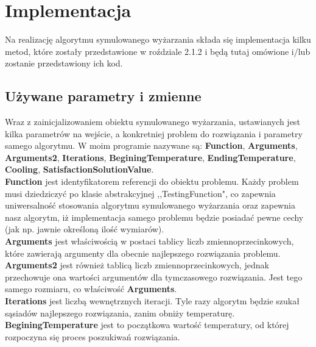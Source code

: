\documentclass[twoside]{projektInzynierskiMS1}
\newcommand{\si}{ś}
\begin{document}
\section{Implementacja}

Na realizację algorytmu symulowanego wyżarzania składa się implementacja kilku metod, które zostały przedstawione w roździale 2.1.2 i będą tutaj omówione i/lub zostanie przedstawiony ich kod. \\

\subsection{Używane parametry i zmienne}
Wraz z zainicjalizowaniem obiektu symulowanego wyżarzania, ustawianych jest kilka parametrów na wej\si cie, a konkretniej problem do rozwiązania i parametry samego algorytmu. W moim programie nazywane są: \textbf{Function}, \textbf{Arguments}, \textbf{Arguments2}, \textbf{Iterations}, \textbf{BeginingTemperature}, \textbf{EndingTemperature}, \textbf{Cooling}, \textbf{SatisfactionSolutionValue}. \\

\textbf{Function} jest identyfikatorem referencji do obiektu problemu. Każdy problem musi dziedziczyć po klasie abstrakcyjnej ,,TestingFunction", co zapewnia uniwersalno\si ć stosowania algorytmu symulowanego wyżarzania oraz zapewnia nasz algorytm, iż implementacja samego problemu będzie posiadać pewne cechy (jak np. jawnie okre\si loną ilo\si ć wymiarów). \\

\textbf{Arguments} jest wła\si ciwo\si cią w postaci tablicy liczb zmiennoprzecinkowych, które zawierają argumenty dla obecnie najlepszego rozwiązania problemu. \\

\textbf{Arguments2} jest również tablicą liczb zmiennoprzecinkowych, jednak przechowuje ona warto\si ci argumentów dla tymczasowego rozwiązania. Jest tego samego rozmiaru, co wła\si ciwo\si ć \textbf{Arguments}. \\

\textbf{Iterations} jest liczbą wewnętrznych iteracji. Tyle razy algorytm będzie szukał sąsiadów najlepszego rozwiązania, zanim obniży temperaturę. \\

\textbf{BeginingTemperature} jest to początkowa warto\si ć temperatury, od której rozpoczyna się proces poszukiwań rozwiązania. \\ 
\end{document}
